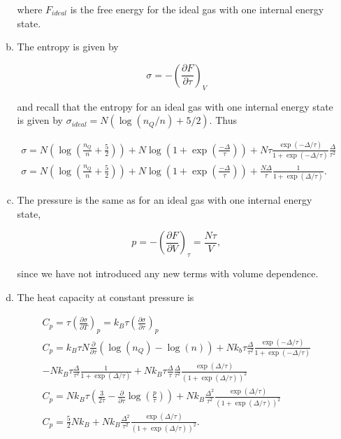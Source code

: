 \documentclass{article}
\begin{document}
\begin{enumerate}
\begin{enumerate}[(a)]
		where $F_{ideal}$ is the free energy for the ideal gas with one internal energy state.

		\item

		The entropy is given by

		$$\sigma = - \left( \frac{\partial F}{\partial \tau} \right)_V$$

		and recall that the entropy for an ideal gas with one internal energy state is given by $\sigma_{ideal} = N (\log (n_Q / n) + 5/2)$. Thus

		\begin{gather*}
		\sigma = N \left( \log \left( \frac{n_Q}{n} + \frac{5}{2} \right) \right) + N \log \left( 1 + \exp \left( \frac{- \Delta}{\tau} \right) \right) + N \tau \frac{\exp(-\Delta/\tau)}{1 + \exp(-\Delta /\tau)} \frac{\Delta}{\tau^2} \\
		\sigma = N \left( \log \left( \frac{n_Q}{n} + \frac{5}{2} \right) \right) + N \log \left( 1 + \exp \left( \frac{- \Delta}{\tau} \right) \right) + \frac{N \Delta}{\tau} \frac{1}{1 + \exp(\Delta /\tau)}.
		\end{gather*}

		\item

		The pressure is the same as for an ideal gas with one internal energy state,

		$$p = - \left( \frac{\partial F}{\partial V} \right)_\tau = \frac{N\tau}{V},$$

		since we have not introduced any new terms with volume dependence.

		\item

		The heat capacity at constant pressure is

		\begin{gather*}
		C_p = \tau \left( \frac{\partial \sigma}{\partial T} \right)_p = k_B \tau  \left( \frac{\partial \sigma}{\partial \tau} \right)_p \\
		C_p = k_B \tau N \frac{\partial }{\partial \tau}\left( \log (n_Q) - \log(n) \right) + Nk_b \tau  \frac{\Delta}{\tau^2}\frac{\exp(-\Delta/\tau)}{1 + \exp(-\Delta/\tau)} \\
		- Nk_B \tau \frac{\Delta}{\tau^2} \frac{1}{1 + \exp(\Delta /\tau)} + Nk_B \tau \frac{\Delta}{\tau} \frac{\Delta}{\tau^2} \frac{\exp(\Delta /\tau)}{(1 + \exp(\Delta /\tau))^2} \\
		C_p = Nk_B\tau \left( \frac{3}{2 \tau} - \frac{\partial}{\partial \tau} \log \left( \frac{p}{\tau} \right) \right) + Nk_B \frac{\Delta^2}{\tau^2} \frac{\exp(\Delta /\tau)}{(1 + \exp(\Delta /\tau))^2} \\
		C_p = \frac{5}{2}N k_B + Nk_B \frac{\Delta^2}{\tau^2} \frac{\exp(\Delta /\tau)}{(1 + \exp(\Delta /\tau))^2}.
		\end{gather*}


\end{enumerate}
\end{enumerate}
\end{document}
